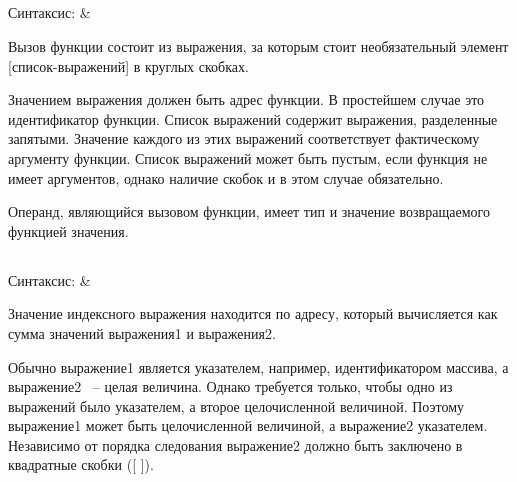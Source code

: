 \subsection{}

\renewcommand{\arraystretch}{1.2} %
\renewcommand{\tabcolsep}{0.2cm}   %
\begin{pHeader}
Синтаксис:      & \\
\end{pHeader}

Вызов функции состоит из выражения, за которым стоит необязательный элемент [список-выражений] в круглых скобках.\killoverfullbefore 

Значением выражения должен быть адрес функции. В простейшем случае это идентификатор функции. Список выражений содержит выражения, разделенные запятыми. Значение каждого из этих выражений соответствует фактическому аргументу функции. Список выражений может быть пустым, если функция не имеет аргументов, однако наличие скобок и в этом случае обязательно. \killoverfullbefore 

Операнд, являющийся вызовом функции, имеет тип и значение возвращаемого функцией значения. \killoverfullbefore 

\subsection{}

\begin{pHeader}
Синтаксис:      & \\
\end{pHeader}

Значение индексного выражения находится по адресу, который вычисляется как сумма значений выражения1 и выражения2. \killoverfullbefore 

Обычно выражение1 является указателем, например, идентификатором массива, а выражение2 ~-- целая величина. Однако требуется только, чтобы одно из выражений было указателем, а второе целочисленной величиной. Поэтому выражение1 может быть целочисленной величиной, а выражение2 указателем. Независимо от порядка следования  выражение2 должно быть заключено в квадратные скобки ([ ]). \killoverfullbefore 

